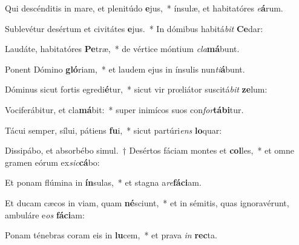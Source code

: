 \item Qui descénditis in mare, et plenitúdo \textbf{e}jus,~* ínsulæ, et habitatóres \textit{e}\textbf{á}rum.
\item Sublevétur desértum et civitátes \textbf{e}jus.~* In dómibus habitá\textit{bit} \textbf{Ce}dar:
\item Laudáte, habitatóres \textbf{Pe}træ,~* de vértice móntium \textit{cla}\textbf{má}bunt.
\item Ponent Dómino \textbf{gló}riam,~* et laudem ejus in ínsulis nun\textit{ti}\textbf{á}bunt.
\item Dóminus sicut fortis egredi\textbf{é}tur,~* sicut vir prœliátor suscitá\textit{bit} \textbf{ze}lum:
\item Vociferábitur, et cla\textbf{má}bit:~* super inimícos suos con\textit{for}\textbf{tá}\textbf{bi}tur.
\item Tácui semper, sílui, pátiens \textbf{fu}i,~* sicut partúri\textit{ens} \textbf{lo}quar:
\item Dissipábo, et absorbébo simul.~† Desértos fáciam montes et \textbf{col}les,~* et omne gramen eórum ex\textit{sic}\textbf{cá}bo:
\item Et ponam flúmina in \textbf{ín}sulas,~* et stagna a\textit{re}\textbf{fá}\textbf{ci}am.
\item Et ducam cæcos in viam, quam \textbf{né}sciunt,~* et in sémitis, quas ignoravérunt, ambuláre e\textit{os} \textbf{fá}\textbf{ci}am:
\item Ponam ténebras coram eis in \textbf{lu}cem,~* et prava \textit{in} \textbf{rec}ta.
